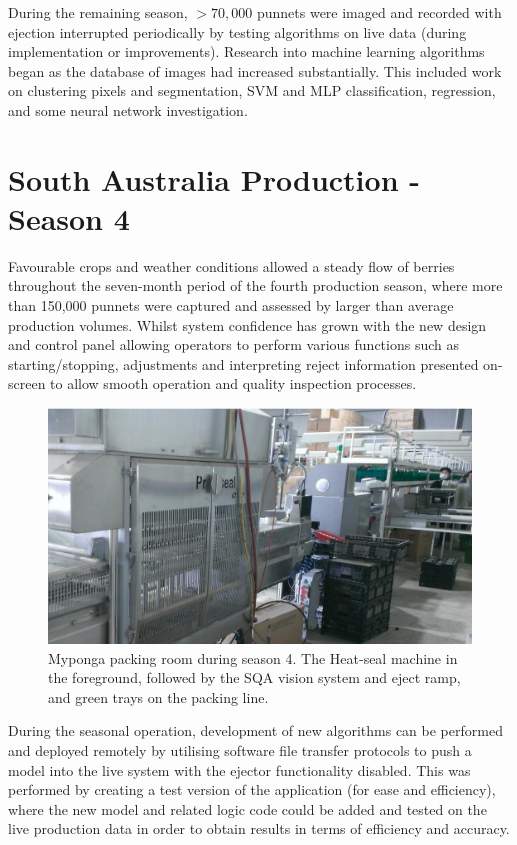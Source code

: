 \documentclass[fleqn,twoside,12pt]{report}
\begin{document}
During the remaining season, $>70,000$ punnets were imaged and recorded with ejection interrupted periodically by testing algorithms on live data (during implementation or improvements). Research into machine learning algorithms began as the database of images had increased substantially. This included work on clustering pixels and segmentation, SVM and MLP classification, regression, and some neural network investigation. 

\section{South Australia Production - Season 4}


Favourable crops and weather conditions allowed a steady flow of berries throughout the seven-month period of the fourth production season, where more than 150,000 punnets were captured and assessed by larger than average production volumes. Whilst system confidence has grown with the new design and control panel allowing operators to perform various functions such as starting/stopping, adjustments and interpreting reject information presented on-screen to allow smooth operation and quality inspection processes.

\begin{figure}[h]
	\centering
	\includegraphics[width=.9\linewidth]{myponga.jpg}
	\caption{Myponga packing room during season 4. The Heat-seal machine in the foreground, followed by the SQA vision system and eject ramp, and green trays on the packing line.}
	\label{fig:myponga}
\end{figure}%

During the seasonal operation, development of new algorithms can be performed and deployed remotely by utilising software file transfer protocols to push a model into the live system with the ejector functionality disabled. This was performed by creating a test version of the application (for ease and efficiency), where the new model and related logic code could be added and tested on the live production data in order to obtain results in terms of efficiency and accuracy.
\end{document}
